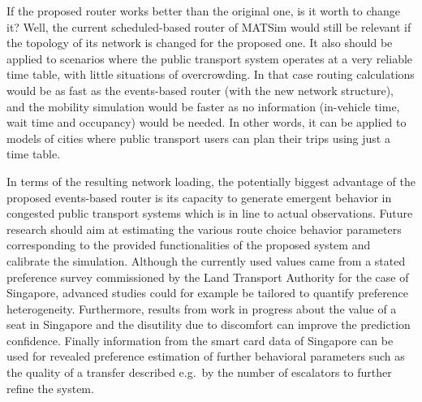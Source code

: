 If the proposed router works better than the original one, is it worth to change it? Well, the current scheduled-based router of MATSim would still be relevant if the topology of its network is changed for the proposed one. It also should be applied to scenarios where the public transport system operates at a very reliable time table, with little situations of overcrowding. In that case routing calculations would be as fast as the events-based router (with the new network structure), and the mobility simulation would be faster as no information (in-vehicle time, wait time and occupancy) would be needed. In other words, it can be applied to models of cities where public transport users can plan their trips using just a time table.

In terms of the resulting network loading, the potentially biggest advantage of the proposed events-based router is its capacity to generate emergent behavior in congested public transport systems which is in line to actual observations. Future research should aim at estimating the various route choice behavior parameters corresponding to the provided functionalities of the proposed system and calibrate the simulation. Although the currently used values came from a stated preference survey commissioned by the Land Transport Authority for the case of Singapore, advanced studies could for example be tailored to quantify preference heterogeneity. Furthermore, results from work in progress about the value of a seat in Singapore and the disutility due to discomfort can improve the prediction confidence. Finally information from the smart card data of Singapore can be used for revealed preference estimation of further behavioral parameters such as the quality of a transfer described e.g.\ by the number of escalators to further refine the system.





